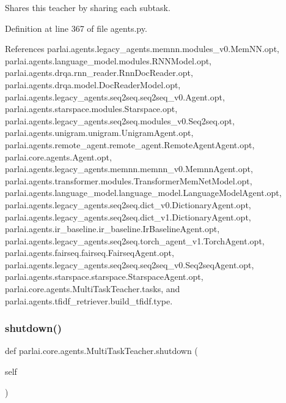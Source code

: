 \begin{DoxyVerb}Shares this teacher by sharing each subtask.\end{DoxyVerb}
 

Definition at line 367 of file agents.\+py.



References parlai.\+agents.\+legacy\+\_\+agents.\+memnn.\+modules\+\_\+v0.\+Mem\+N\+N.\+opt, parlai.\+agents.\+language\+\_\+model.\+modules.\+R\+N\+N\+Model.\+opt, parlai.\+agents.\+drqa.\+rnn\+\_\+reader.\+Rnn\+Doc\+Reader.\+opt, parlai.\+agents.\+drqa.\+model.\+Doc\+Reader\+Model.\+opt, parlai.\+agents.\+legacy\+\_\+agents.\+seq2seq.\+seq2seq\+\_\+v0.\+Agent.\+opt, parlai.\+agents.\+starspace.\+modules.\+Starspace.\+opt, parlai.\+agents.\+legacy\+\_\+agents.\+seq2seq.\+modules\+\_\+v0.\+Seq2seq.\+opt, parlai.\+agents.\+unigram.\+unigram.\+Unigram\+Agent.\+opt, parlai.\+agents.\+remote\+\_\+agent.\+remote\+\_\+agent.\+Remote\+Agent\+Agent.\+opt, parlai.\+core.\+agents.\+Agent.\+opt, parlai.\+agents.\+legacy\+\_\+agents.\+memnn.\+memnn\+\_\+v0.\+Memnn\+Agent.\+opt, parlai.\+agents.\+transformer.\+modules.\+Transformer\+Mem\+Net\+Model.\+opt, parlai.\+agents.\+language\+\_\+model.\+language\+\_\+model.\+Language\+Model\+Agent.\+opt, parlai.\+agents.\+legacy\+\_\+agents.\+seq2seq.\+dict\+\_\+v0.\+Dictionary\+Agent.\+opt, parlai.\+agents.\+legacy\+\_\+agents.\+seq2seq.\+dict\+\_\+v1.\+Dictionary\+Agent.\+opt, parlai.\+agents.\+ir\+\_\+baseline.\+ir\+\_\+baseline.\+Ir\+Baseline\+Agent.\+opt, parlai.\+agents.\+legacy\+\_\+agents.\+seq2seq.\+torch\+\_\+agent\+\_\+v1.\+Torch\+Agent.\+opt, parlai.\+agents.\+fairseq.\+fairseq.\+Fairseq\+Agent.\+opt, parlai.\+agents.\+legacy\+\_\+agents.\+seq2seq.\+seq2seq\+\_\+v0.\+Seq2seq\+Agent.\+opt, parlai.\+agents.\+starspace.\+starspace.\+Starspace\+Agent.\+opt, parlai.\+core.\+agents.\+Multi\+Task\+Teacher.\+tasks, and parlai.\+agents.\+tfidf\+\_\+retriever.\+build\+\_\+tfidf.\+type.

\mbox{\label{classparlai_1_1core_1_1agents_1_1MultiTaskTeacher_a259dd3bec3f24669e835d8fbac657c3b}} 
\subsubsection{\texorpdfstring{shutdown()}{shutdown()}}
{\footnotesize\ttfamily def parlai.\+core.\+agents.\+Multi\+Task\+Teacher.\+shutdown (\begin{DoxyParamCaption}\item[{}]{self }\end{DoxyParamCaption})}

